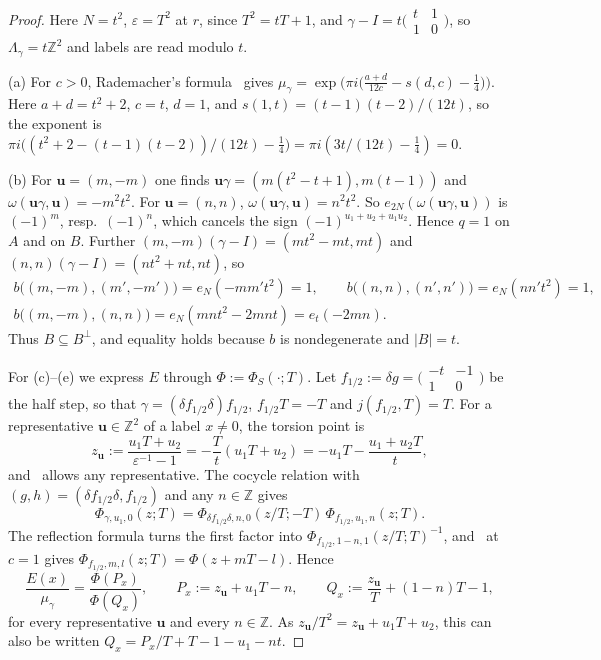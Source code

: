 \documentclass[11pt]{amsart}
\numberwithin{equation}{section}
\theoremstyle{plain}
\theoremstyle{definition}
\theoremstyle{remark}
\begin{document}
\begin{proof}
Here \(N=t^2\), \(\varepsilon=T^2\) at \(r\), since \(T^2=tT+1\), and \(\gamma-I=t\bigl(\begin{smallmatrix}t&1\\1&0\end{smallmatrix}\bigr)\), so \(\Lambda_\gamma=t\mathbb Z^2\) and labels are read modulo \(t\).

(a) For \(c>0\), Rademacher's formula~\cite{RG} gives \(\mu_\gamma=\exp\bigl(\pi i\bigl(\tfrac{a+d}{12c}-s(d,c)-\tfrac14\bigr)\bigr)\). Here \(a+d=t^2+2\), \(c=t\), \(d=1\), and \(s(1,t)=(t-1)(t-2)/(12t)\), so the exponent is \(\pi i\bigl((t^2+2-(t-1)(t-2))/(12t)-\tfrac14\bigr)=\pi i(3t/(12t)-\tfrac14)=0\).

(b) For \(\mathbf u=(m,-m)\) one finds \(\mathbf u\gamma=(m(t^2-t+1),m(t-1))\) and \(\omega(\mathbf u\gamma,\mathbf u)=-m^2t^2\). For \(\mathbf u=(n,n)\), \(\omega(\mathbf u\gamma,\mathbf u)=n^2t^2\). So \(e_{2N}(\omega(\mathbf u\gamma,\mathbf u))\) is \((-1)^m\), resp.\ \((-1)^n\), which cancels the sign \((-1)^{u_1+u_2+u_1u_2}\). Hence \(q=1\) on \(A\) and on \(B\). Further \((m,-m)(\gamma-I)=(mt^2-mt,mt)\) and \((n,n)(\gamma-I)=(nt^2+nt,nt)\), so
\begin{gather*}
b\bigl((m,-m),(m',-m')\bigr)=e_N(-mm't^2)=1,\qquad b\bigl((n,n),(n',n')\bigr)=e_N(nn't^2)=1,\\
b\bigl((m,-m),(n,n)\bigr)=e_N(mnt^2-2mnt)=e_t(-2mn).
\end{gather*}
Thus \(B\subseteq B^\perp\), and equality holds because \(b\) is nondegenerate and \(|B|=t\).

For (c)--(e) we express \(E\) through \(\Phi:=\Phi_S(\cdot;T)\). Let \(f_{1/2}:=\delta g=\bigl(\begin{smallmatrix}-t&-1\\1&0\end{smallmatrix}\bigr)\) be the half step, so that \(\gamma=(\delta f_{1/2}\delta)f_{1/2}\), \(f_{1/2}T=-T\) and \(j(f_{1/2},T)=T\). For a representative \(\mathbf u\in\mathbb Z^2\) of a label \(x\ne0\), the torsion point is
\[z_{\mathbf u}:=\frac{u_1T+u_2}{\varepsilon^{-1}-1}=-\frac Tt(u_1T+u_2)=-u_1T-\frac{u_1+u_2T}t,\]
and~\cite[Lemma~2]{RW} allows any representative. The cocycle relation with \((g,h)=(\delta f_{1/2}\delta,f_{1/2})\) and any \(n\in\mathbb Z\) gives
\[\Phi_{\gamma,u_1,0}(z;T)=\Phi_{\delta f_{1/2}\delta,n,0}(z/T;-T)\,\Phi_{f_{1/2},u_1,n}(z;T).\]
The reflection formula turns the first factor into \(\Phi_{f_{1/2},1-n,1}(z/T;T)^{-1}\), and~\cite[(19)]{RW} at \(c=1\) gives \(\Phi_{f_{1/2},m,l}(z;T)=\Phi(z+mT-l)\). Hence
\begin{equation}\label{eq:ratioPQ}
\frac{E(x)}{\mu_\gamma}=\frac{\Phi(P_x)}{\Phi(Q_x)},\qquad P_x:=z_{\mathbf u}+u_1T-n,\qquad Q_x:=\frac{z_{\mathbf u}}T+(1-n)T-1 ,
\end{equation}
for every representative \(\mathbf u\) and every \(n\in\mathbb Z\). As \(z_{\mathbf u}/T^2=z_{\mathbf u}+u_1T+u_2\), this can also be written \(Q_x=P_x/T+T-1-u_1-nt\).


\end{proof}
\end{document}
